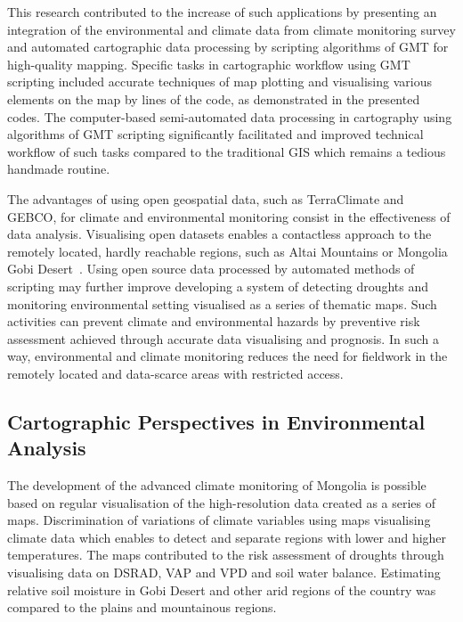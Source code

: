 \documentclass[geosciences,article,accept,pdftex,oneauthor]{Definitions/mdpi}
\begin{document}
This research contributed to the increase of such applications by presenting an integration of the environmental and climate data from climate monitoring survey and automated cartographic data processing by scripting algorithms of GMT for high-quality mapping. Specific tasks in cartographic workflow using GMT scripting included accurate techniques of map plotting and visualising various elements on the map by lines of the code, as demonstrated in the presented codes. The computer-based semi-automated data processing in cartography using algorithms of GMT scripting significantly facilitated and improved technical workflow of such tasks compared to the traditional GIS which remains a tedious handmade routine. 

The advantages of using open geospatial data, such as TerraClimate and GEBCO, for climate and environmental monitoring consist in the effectiveness of data analysis. Visualising open datasets enables a contactless approach to the remotely located, hardly reachable regions, such as Altai Mountains or Mongolia Gobi Desert~\cite{HEINER202078}. Using open source data processed by automated methods of scripting may further improve developing a system of detecting droughts and monitoring environmental setting visualised as a series of thematic maps. Such activities can prevent climate and environmental hazards by preventive risk assessment achieved through accurate data visualising and prognosis. In such a way, environmental and climate monitoring reduces the need for fieldwork in the remotely located and data-scarce areas with restricted access.

\subsection{Cartographic Perspectives in Environmental Analysis}
The development of the advanced climate monitoring of Mongolia is possible based on regular visualisation of the high-resolution data created as a series of maps. Discrimination of variations of climate variables using maps visualising climate data which enables to detect and separate regions with lower and higher temperatures. The maps contributed to the risk assessment of droughts through visualising data on DSRAD, VAP and VPD and soil water balance. Estimating relative soil moisture in Gobi Desert and other arid regions of the country was compared to the plains and mountainous regions. 
\end{document}
